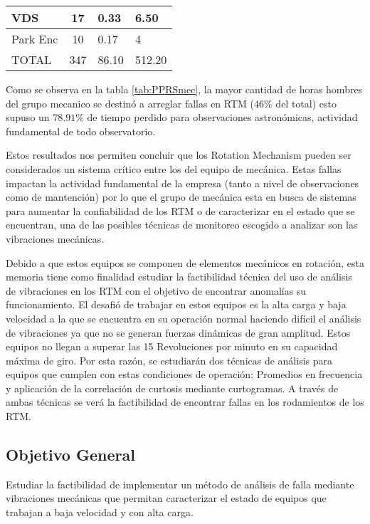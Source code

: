 \begin{table}[H]
\begin{tabular}{|l|c|p{4cm}|p{4cm}|}
                VDS                           & 17                 & 0.33                          & 6.50                                              \\ \hline
                Park Enc                      & 10                 & 0.17                          & 4                                                 \\ \hline
                TOTAL                         & 347                & 86.10                         & 512.20                                            \\ \hline
                \end{tabular}
            \end{table}            
            Como se observa en la tabla \ref{tab:PPRSmec}, la mayor cantidad  de horas hombres del grupo mecanico se destinó a arreglar fallas en RTM ($46\%$ del total) esto supuso un $78.91 \%$  de tiempo perdido para observaciones astronómicas, actividad fundamental de todo observatorio.
            
            Estos resultados nos permiten concluir  que los Rotation Mechanism pueden ser considerados un sistema crítico entre los del equipo de mecánica. Estas fallas impactan la actividad fundamental de la empresa (tanto a nivel de observaciones como de mantención) por lo que el grupo de mecánica esta en busca de sistemas para aumentar la confiabilidad de los RTM o de caracterizar en el estado que se encuentran, una de las posibles técnicas de monitoreo escogido a analizar son las vibraciones mecánicas.
            
            Debido a que estos equipos se componen de elementos mecánicos en rotación, esta memoria tiene como finalidad estudiar la factibilidad técnica del uso de análisis de vibraciones en los RTM con el objetivo de encontrar anomalías su funcionamiento. El desafió de trabajar en estos equipos es la alta carga y baja velocidad a la que se encuentra en su operación normal haciendo difícil el análisis de vibraciones ya que no se generan fuerzas dinámicas de gran amplitud. Estos equipos no llegan a superar las 15 Revoluciones por minuto en su capacidad máxima de giro. Por esta razón, se estudiarán dos técnicas de análisis para equipos que cumplen con estas condiciones de operación: Promedios en frecuencia y aplicación de la correlación de curtosis mediante curtogramas. A través de ambas técnicas se verá la factibilidad de encontrar fallas en los rodamientos de los RTM. 
        \subsection{Objetivo General} \label{ssec:objgral}
            Estudiar la factibilidad de implementar un método de análisis de falla mediante vibraciones mecánicas que permitan caracterizar el estado de equipos que trabajan a baja velocidad y con alta carga.
